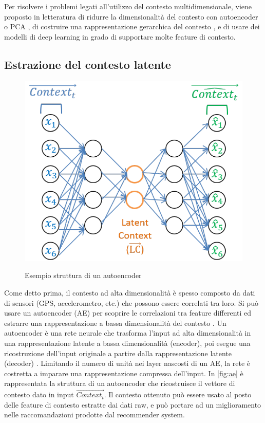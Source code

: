 Per risolvere i problemi legati all'utilizzo del contesto multidimensionale, viene proposto in letteratura di ridurre la dimensionalità del contesto con autoencoder o PCA \cite{latent-context} \cite{context-autoencoder}, di costruire una rappresentazione gerarchica del contesto \cite{hierarchical-context}, e di usare dei modelli di deep learning in grado di supportare molte feature di contesto\cite{context-aware-deep-learning}.

\subsection{Estrazione del contesto latente} 
\label{ssec:latent-context}
\begin{figure}
 \centering
  \includegraphics[scale=0.65]{immagini/autoencoder.png}
  \caption{Esempio struttura di un autoencoder}
  \cite{hierarchical-context}
  \label{fig:ae}
\end{figure}

Come detto prima, il contesto ad alta dimensionalità è spesso composto da dati di sensori (GPS, accelerometro, etc.) che possono essere correlati tra loro. Si può usare un autoencoder (AE) per scoprire le correlazioni tra feature differenti ed estrarre una rappresentazione a bassa dimensionalità del contesto \cite{latent-context}. Un autoencoder è una rete neurale che trasforma l'input ad alta dimensionalità in una rappresentazione latente a bassa dimensionalità (encoder), poi esegue una ricostruzione dell'input originale a partire dalla rappresentazione latente (decoder) \cite{autoencoder}. Limitando il numero di unità nei layer nascosti di un AE, la rete è costretta a imparare una rappresentazione compressa dell'input. In \autoref{fig:ae} è rappresentata la struttura di un autoencoder che ricostruisce il vettore di contesto dato in input $\overrightarrow{Context_t}$. Il contesto ottenuto può essere usato al posto delle feature di contesto estratte dai dati raw, e può portare ad un miglioramento nelle raccomandazioni prodotte dal recommender system.

